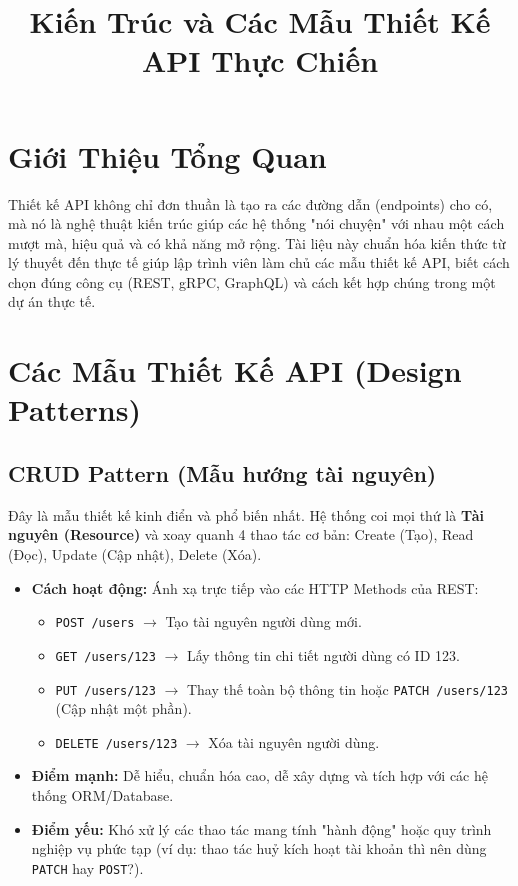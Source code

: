 \documentclass[12pt,a4paper]{article}
\title{\textbf{Kiến Trúc và Các Mẫu Thiết Kế API Thực Chiến}}
\author{}
\date{}
\begin{document}
\maketitle

\tableofcontents
\newpage

\section{Giới Thiệu Tổng Quan}
Thiết kế API không chỉ đơn thuần là tạo ra các đường dẫn (endpoints) cho có, mà nó là nghệ thuật kiến trúc giúp các hệ thống "nói chuyện" với nhau một cách mượt mà, hiệu quả và có khả năng mở rộng. Tài liệu này chuẩn hóa kiến thức từ lý thuyết đến thực tế giúp lập trình viên làm chủ các mẫu thiết kế API, biết cách chọn đúng công cụ (REST, gRPC, GraphQL) và cách kết hợp chúng trong một dự án thực tế.

\section{Các Mẫu Thiết Kế API (Design Patterns)}

\subsection{CRUD Pattern (Mẫu hướng tài nguyên)}
Đây là mẫu thiết kế kinh điển và phổ biến nhất. Hệ thống coi mọi thứ là \textbf{Tài nguyên (Resource)} và xoay quanh 4 thao tác cơ bản: Create (Tạo), Read (Đọc), Update (Cập nhật), Delete (Xóa).
\begin{itemize}
    \item \textbf{Cách hoạt động:} Ánh xạ trực tiếp vào các HTTP Methods của REST:
    \begin{itemize}
        \item \texttt{POST /users} $\rightarrow$ Tạo tài nguyên người dùng mới.
        \item \texttt{GET /users/123} $\rightarrow$ Lấy thông tin chi tiết người dùng có ID 123.
        \item \texttt{PUT /users/123} $\rightarrow$ Thay thế toàn bộ thông tin hoặc \texttt{PATCH /users/123} (Cập nhật một phần).
        \item \texttt{DELETE /users/123} $\rightarrow$ Xóa tài nguyên người dùng.
    \end{itemize}
    \item \textbf{Điểm mạnh:} Dễ hiểu, chuẩn hóa cao, dễ xây dựng và tích hợp với các hệ thống ORM/Database.
    \item \textbf{Điểm yếu:} Khó xử lý các thao tác mang tính "hành động" hoặc quy trình nghiệp vụ phức tạp (ví dụ: thao tác huỷ kích hoạt tài khoản thì nên dùng \texttt{PATCH} hay \texttt{POST}?).
\end{itemize}
\end{document}

